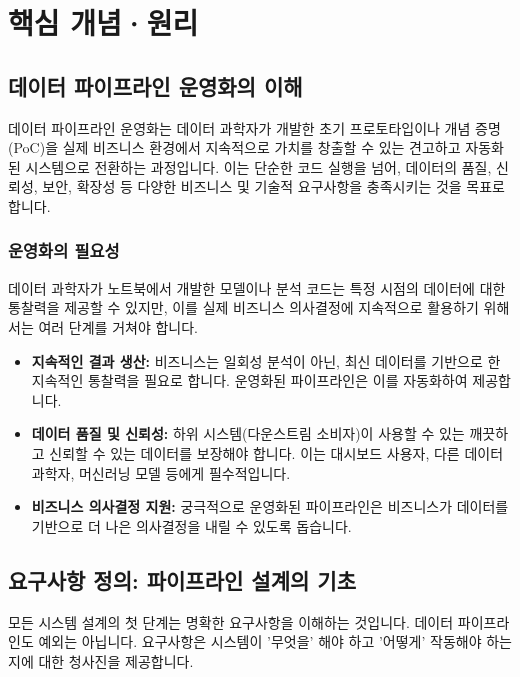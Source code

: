 \documentclass[11pt,a4paper]{article}
\begin{document}
\newpage
\section*{\centering 핵심 개념·원리}

\subsection{데이터 파이프라인 운영화의 이해}

\begin{conceptbox}
데이터 파이프라인 운영화는 데이터 과학자가 개발한 초기 프로토타입이나 개념 증명(PoC)을 실제 비즈니스 환경에서 지속적으로 가치를 창출할 수 있는 견고하고 자동화된 시스템으로 전환하는 과정입니다. 이는 단순한 코드 실행을 넘어, 데이터의 품질, 신뢰성, 보안, 확장성 등 다양한 비즈니스 및 기술적 요구사항을 충족시키는 것을 목표로 합니다.
\end{conceptbox}

\subsubsection{운영화의 필요성}
데이터 과학자가 노트북에서 개발한 모델이나 분석 코드는 특정 시점의 데이터에 대한 통찰력을 제공할 수 있지만, 이를 실제 비즈니스 의사결정에 지속적으로 활용하기 위해서는 여러 단계를 거쳐야 합니다.

\begin{itemize}
    \item \textbf{지속적인 결과 생산:} 비즈니스는 일회성 분석이 아닌, 최신 데이터를 기반으로 한 지속적인 통찰력을 필요로 합니다. 운영화된 파이프라인은 이를 자동화하여 제공합니다.
    \item \textbf{데이터 품질 및 신뢰성:} 하위 시스템(다운스트림 소비자)이 사용할 수 있는 깨끗하고 신뢰할 수 있는 데이터를 보장해야 합니다. 이는 대시보드 사용자, 다른 데이터 과학자, 머신러닝 모델 등에게 필수적입니다.
    \item \textbf{비즈니스 의사결정 지원:} 궁극적으로 운영화된 파이프라인은 비즈니스가 데이터를 기반으로 더 나은 의사결정을 내릴 수 있도록 돕습니다.
\end{itemize}

\subsection{요구사항 정의: 파이프라인 설계의 기초}

모든 시스템 설계의 첫 단계는 명확한 요구사항을 이해하는 것입니다. 데이터 파이프라인도 예외는 아닙니다. 요구사항은 시스템이 '무엇을' 해야 하고 '어떻게' 작동해야 하는지에 대한 청사진을 제공합니다.
\end{document}
